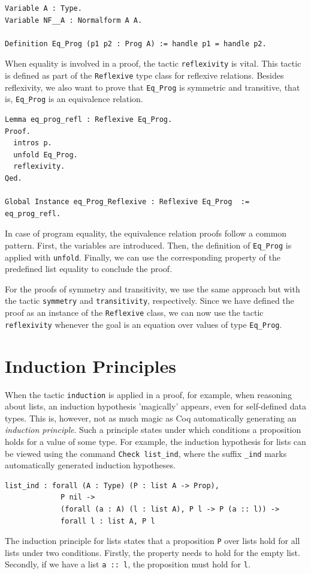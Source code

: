 \documentclass[a4paper, 11pt, fleqn, twoside, abstract=on]{scrreprt}
\newcommand{\cinl}[1]{\texttt{#1}}
\begin{document}
\begin{verbatim}
Variable A : Type.
Variable NF__A : Normalform A A.

Definition Eq_Prog (p1 p2 : Prog A) := handle p1 = handle p2.
\end{verbatim}

When equality is involved in a proof, the tactic \cinl{reflexivity} is vital.
This tactic is defined as part of the \cinl{Reflexive} type class for reflexive relations.
Besides reflexivity, we also want to prove that \cinl{Eq_Prog} is symmetric and transitive, that is, \cinl{Eq_Prog} is an equivalence relation.

\begin{verbatim}
Lemma eq_prog_refl : Reflexive Eq_Prog.
Proof. 
  intros p.
  unfold Eq_Prog.
  reflexivity.
Qed.

Global Instance eq_Prog_Reflexive : Reflexive Eq_Prog  := eq_prog_refl.
\end{verbatim}

In case of program equality, the equivalence relation proofs follow a common pattern.
First, the variables are introduced.
Then, the definition of \cinl{Eq_Prog} is applied with \cinl{unfold}.
Finally, we can use the corresponding property of the predefined list equality to conclude the proof.

For the proofs of symmetry and transitivity, we use the same approach but with the tactic \cinl{symmetry} and \cinl{transitivity}, respectively.
Since we have defined the proof as an instance of the \cinl{Reflexive} class, we can now use the tactic \cinl{reflexivity} whenever the goal is an equation over values of type \cinl{Eq_Prog}.

\section{Induction Principles}

When the tactic \cinl{induction} is applied in a proof, for example, when reasoning about lists, an induction hypothesis 'magically' appears, even for self-defined data types.
This is, however, not as much magic as Coq automatically generating an \textit{induction principle}.
Such a principle states under which conditions a proposition holds for a value of some type.
For example, the induction hypothesis for lists can be viewed using the command \cinl{Check list_ind}, where the suffix \cinl{_ind} marks automatically generated induction hypotheses.

\begin{verbatim}
list_ind : forall (A : Type) (P : list A -> Prop),
             P nil ->
             (forall (a : A) (l : list A), P l -> P (a :: l)) ->
             forall l : list A, P l
\end{verbatim}
\noindent
The induction principle for lists states that a proposition \cinl{P} over lists hold for all lists under two conditions.
Firstly, the property needs to hold for the empty list.
Secondly, if we have a list \cinl{a :: l}, the proposition must hold for \cinl{l}.
\end{document}
